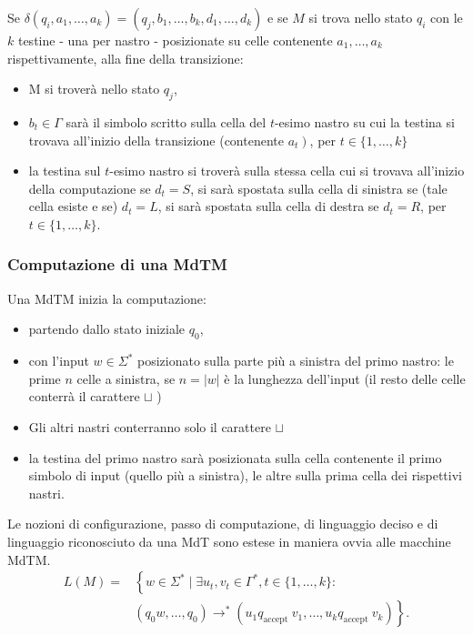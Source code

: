 Se $\delta\left(q_{i}, a_{1}, \ldots, a_{k}\right)=\left(q_{j}, b_{1}, \ldots, b_{k}, d_{1}, \ldots, d_{k}\right)$ e se $M$ si trova nello stato $q_{i}$ con le $k$ testine - una per nastro -
posizionate su celle contenente $a_{1}, \ldots, a_{k}$ rispettivamente, alla fine della transizione:
\begin{itemize}
    \item M si troverà nello stato $q_{j}$,
    \item $b_{t} \in \Gamma$ sarà il simbolo scritto sulla cella del $t$-esimo nastro su cui la testina si trovava all'inizio della transizione (contenente $\left.a_{t}\right)$, per $t \in\{1, \ldots, k\}$
    \item la testina sul $t$-esimo nastro si troverà sulla stessa cella cui si trovava all'inizio della computazione se $d_{t}=S$, si sarà spostata sulla cella di sinistra se (tale cella esiste e se) $d_{t}=L$, si sarà spostata sulla cella di destra se $d_{t}=R$, per $t \in\{1, \ldots, k\}$.
\end{itemize}


\subsubsection{Computazione di una MdTM}

Una MdTM inizia la computazione:
\begin{itemize}
    \item partendo dallo stato iniziale $q_{0}$,
    \item con l'input $w \in \Sigma^{*}$ posizionato sulla parte più a sinistra del primo nastro: le prime $n$ celle a sinistra, se $n=|w|$ è la lunghezza dell'input (il resto delle celle conterrà il carattere $\sqcup$ )
    \item Gli altri nastri conterranno solo il carattere $\sqcup$
    \item la testina del primo nastro sarà posizionata sulla cella contenente il primo simbolo di input (quello più a sinistra), le altre sulla prima cella dei rispettivi nastri.
\end{itemize}

Le nozioni di configurazione, passo di computazione, di linguaggio deciso e di linguaggio riconosciuto da una MdT sono estese in maniera ovvia alle macchine MdTM.
$$
\begin{aligned}
L(M)=&\left\{w \in \Sigma^{*} \mid \exists u_{t}, v_{t} \in \Gamma^{*}, t \in\{1, \ldots, k\}:\right.\\
&\left.\left(q_{0} w, \ldots, q_{0}\right) \rightarrow^{*}\left(u_{1} q_{\text {accept }} v_{1}, \ldots, u_{k} q_{\text {accept }} v_{k}\right)\right\} .
\end{aligned}
$$

